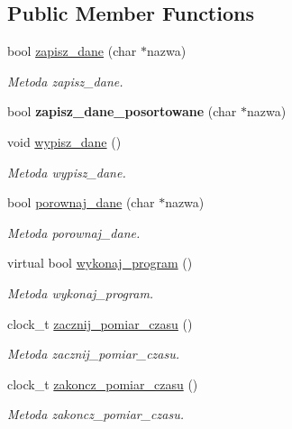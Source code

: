 \subsection*{Public Member Functions}
\begin{DoxyCompactItemize}
\item 
bool \hyperlink{class_program_aaef7fcaf64830eb231cbb9e887d705af}{zapisz\-\_\-dane} (char $\ast$nazwa)
\begin{DoxyCompactList}\small\item\em Metoda zapisz\-\_\-dane. \end{DoxyCompactList}\item 
\hypertarget{class_program_a320c378a3507881d2d62bbd0c8ea07d9}{bool {\bfseries zapisz\-\_\-dane\-\_\-posortowane} (char $\ast$nazwa)}\label{class_program_a320c378a3507881d2d62bbd0c8ea07d9}

\item 
void \hyperlink{class_program_a060ea3afebf696152d50135d20856e5a}{wypisz\-\_\-dane} ()
\begin{DoxyCompactList}\small\item\em Metoda wypisz\-\_\-dane. \end{DoxyCompactList}\item 
bool \hyperlink{class_program_ab5441e0e8ecd02ffeada4d77aaad2726}{porownaj\-\_\-dane} (char $\ast$nazwa)
\begin{DoxyCompactList}\small\item\em Metoda porownaj\-\_\-dane. \end{DoxyCompactList}\item 
virtual bool \hyperlink{class_program_ac396401ba5cade863d0e6acb727bec4e}{wykonaj\-\_\-program} ()
\begin{DoxyCompactList}\small\item\em Metoda wykonaj\-\_\-program. \end{DoxyCompactList}\item 
clock\-\_\-t \hyperlink{class_program_ab68c69977637eb8cc05a57e176a21986}{zacznij\-\_\-pomiar\-\_\-czasu} ()
\begin{DoxyCompactList}\small\item\em Metoda zacznij\-\_\-pomiar\-\_\-czasu. \end{DoxyCompactList}\item 
clock\-\_\-t \hyperlink{class_program_a3515568f8df7224bfd8fd8b7b76ab0ba}{zakoncz\-\_\-pomiar\-\_\-czasu} ()
\begin{DoxyCompactList}\small\item\em Metoda zakoncz\-\_\-pomiar\-\_\-czasu. \end{DoxyCompactList}\end{DoxyCompactItemize}
